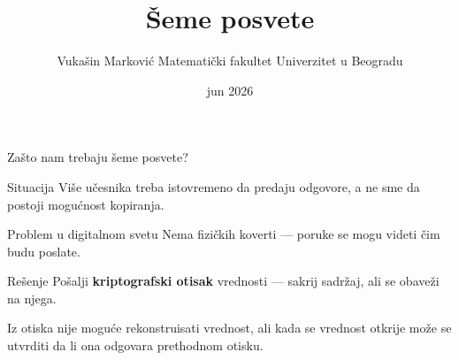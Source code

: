 \documentclass[aspectratio=1610]{beamer}
\title{Šeme posvete}
\author{Vukašin Marković \textbullet{} Matematički fakultet \textbullet{} Univerzitet u Beogradu}
\date{jun 2026}
\newcommand{\keyword}[1]{\textcolor{wcprimary}{\textbf{#1}}}
\begin{document}
\begin{frame}
  \titlepage
\end{frame}


\begin{frame}{Zašto nam trebaju šeme posvete?}
\begin{block}{Situacija}
  Više učesnika treba istovremeno da predaju odgovore, a ne sme da postoji mogućnost kopiranja.
\end{block}

\begin{alertblock}{Problem u digitalnom svetu}
  Nema fizičkih koverti — poruke se mogu videti čim budu poslate.
\end{alertblock}

\begin{exampleblock}{Rešenje}
  Pošalji \keyword{kriptografski otisak} vrednosti — sakrij sadržaj, ali se obaveži na njega.
\end{exampleblock}
\vspace{4pt}
{\footnotesize * Iz otiska nije moguće rekonstruisati vrednost, ali kada se vrednost otkrije može se utvrditi da li ona odgovara prethodnom otisku.}
\end{frame}
\end{document}
